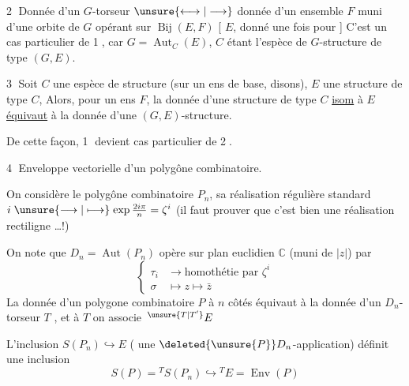 \textcircled{2} Donnée d'un $G$-torseur  $\unsure{\longleftrightarrow|\longrightarrow}$ donnée d'un ensemble $F$ muni d'une orbite de $G$ opérant sur $\operatorname{Bij}(E,F)$
[ $E$,  donné une fois pour ] C'est un cas particulier de \textcircled{1}, car $G=\operatorname{Aut}_{C}(E)$, $C$ étant l'espèce de $G$-structure de type $(G,E)$.

\textcircled{3} Soit $C$ une espèce de structure (sur un ens de base, disons), $E$ une structure de type $C$,  Alors, pour un ens $F$, la donnée d'une structure de type $C$ \uline{isom} à $E$ \uline{équivaut} à la donnée d'une $(G,E)$-structure.

De cette façon, \textcircled{1} devient cas particulier de \textcircled{2}.

\textcircled{4} Enveloppe vectorielle d'un polygône combinatoire.

On considère le polygône  combinatoire  \deleted{$\unsure{[1,n]|[1,n[}$\unsure{,}} $P_n$, sa réalisation  régulière standard $i\mathrel{\unsure{\longrightarrow|\longmapsto}}\exp\frac{2i\pi}{n}=\zeta^i$ (il faut prouver que c'est bien une réalisation rectiligne \ldots !)

On note que $D_n=\operatorname{Aut}(P_n)$ opère sur   plan euclidien  $\mathbb{C}$ (muni de $|z|$) par 
\[
\left\{\begin{aligned}
\tau_i &\longrightarrow \text{homothétie par }\zeta^i\\
\sigma &\longmapsto z\longmapsto\bar z
\end{aligned}\right.
\]
La donnée d'un polygone combinatoire $P$ à $n$ côtés équivaut à la donnée d'un $D_n$-torseur $T$ , et à $T$ on associe $\,{}^{\unsure{T|T'}}E$

L'inclusion $S(P_n)\hookrightarrow E$ ( une $\deleted{\unsure{P}}D_n$-application) définit une inclusion
\[
 S(P)={}^{T}S(P_n)\hookrightarrow{}^{T}E=\operatorname{Env}(P)
\]

